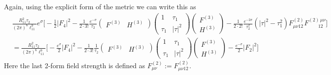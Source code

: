 \documentclass[11pt, class=article, crop=false]{standalone}
\begin{document}
\begin{enumerate}
\[	\]
	Again, using the explicit form of the metric we can write this as
	\[
	\begin{aligned}
		&\frac{R_{11}^2 \tau_2}{(2 \pi)^6 \ell_{11}^9} e^{\sigma} \Big[-\frac{1}{2} |F_4|^2 
		 - \frac{1}{2 \cdot 3!}\frac{e^{-\sigma}}{\tau_2} \begin{pmatrix}
			F^{(3)} & H^{(3)}
		\end{pmatrix}\begin{pmatrix}
			1 & \tau_1\\ \tau_1 & |\tau|^2
		\end{pmatrix}\begin{pmatrix}
			F^{(3)}\\ H^{(3)}
		\end{pmatrix}
		 - \frac{1}{2 \cdot 2!} \frac{e^{-2\sigma}}{\tau_2^2} (|\tau|^2 - \tau_1^2) F_{\mu \nu 12}^{(2)} F_{\qquad12}^{(2)\, \mu \nu} ]\\
		 &= \frac{R_{11}^2 \tau_2}{(2 \pi)^6 \ell_{11}^9} \Big[-\frac{e^{\sigma}}{2} |F_4|^2 
		 - \frac{1}{2 \cdot 3!}\frac{1}{\tau_2} \begin{pmatrix}
			F^{(3)} & H^{(3)}
		\end{pmatrix}\begin{pmatrix}
			1 & \tau_1\\ \tau_1 & |\tau|^2
		\end{pmatrix}\begin{pmatrix}
			F^{(3)}\\ H^{(3)}
		\end{pmatrix}
		 - \frac{e^{-\sigma}}{2} |F_2|^2 \Big]
	\end{aligned}
	\]
	Here the last 2-form field strength is defined as $F^{(2)}_{\mu \nu} := F^{(2)}_{\mu \nu 12}$.
	

\end{enumerate}
\end{document}
